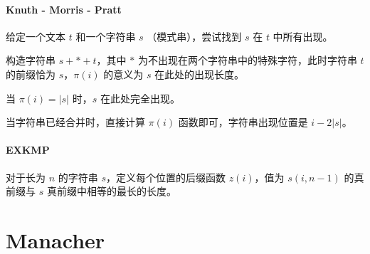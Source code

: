 \documentclass{probook}
\begin{document}
\begin{multicols}{2}


\paragraph{Knuth - Morris - Pratt}

给定一个文本 $t$ 和一个字符串 $s$ （模式串），尝试找到 $s$ 在 $t$ 中所有出现。

构造字符串 $s+*+t$，其中 $*$ 为不出现在两个字符串中的特殊字符，此时字符串 $t$ 的前缀恰为 $s$，$\pi(i)$ 的意义为 $s$ 在此处的出现长度。

当 $\pi(i)=|s|$ 时，$s$ 在此处完全出现。

当字符串已经合并时，直接计算 $\pi(i)$ 函数即可，字符串出现位置是 $i-2|s|$。



\paragraph{EXKMP}

对于长为 $n$ 的字符串 $s$，定义每个位置的后缀函数 $z(i)$，值为 $s(i,n-1)$ 的真前缀与 $s$ 真前缀中相等的最长的长度。



\section{Manacher}





\end{multicols}
\end{document}
